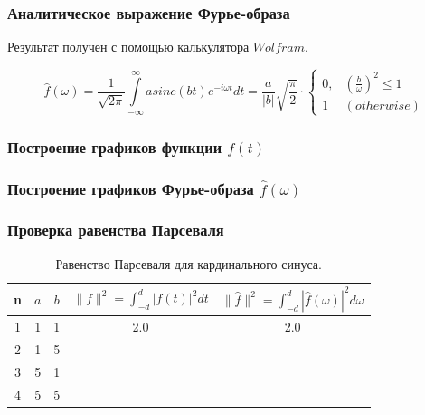 \documentclass[a5paper, 10pt]{article}
\theoremstyle{definition}
\theoremstyle{plain}
\theoremstyle{remark}
\begin{document}
\subsubsection{Аналитическое выражение Фурье-образа}

Результат получен с помощью калькулятора $Wolfram$.

\begin{equation}
\hat{f}(\omega) =
 \frac{1}{\sqrt{2 \pi}} \int \limits_{-\infty}^{\infty}  a sinc(bt) e^{-i \omega t} dt = 
 \frac{a}{|b|} \sqrt{\frac{\pi}{2}} \cdot
\begin{cases}
0, & \left( \frac{b}{\omega} \right)^2 \leq 1\\
1 & (otherwise)
\end{cases}
\end{equation}


\subsubsection{Построение графиков функции $f(t)$}






\subsubsection{Построение графиков Фурье-образа $\hat{f} (\omega)$}





\subsubsection{Проверка равенства Парсеваля}

\begin{table}[h!]
\caption{Равенство Парсеваля для кардинального синуса.}
\label{tabular:timesandtenses}
\begin{center}
\begin{tabular}{|c|c|c|c|c|}
\hline
n & $a$ & $b$ & $\| f \|^2 = \int_{-d}^d |f(t)|^2 dt $ & $\| \hat{f} \|^2 = \int_{-d}^d |\hat{f}(\omega)|^2 d\omega $ \\
\hline
1 & 1 & 1 &  2.0& 2.0\\
\hline
2 & 1 & 5 &  & \\
\hline
3 & 5 & 1 &  & \\
\hline
4 & 5 & 5 &  & \\
\hline
\end{tabular}
\end{center}
\end{table}
\end{document}
